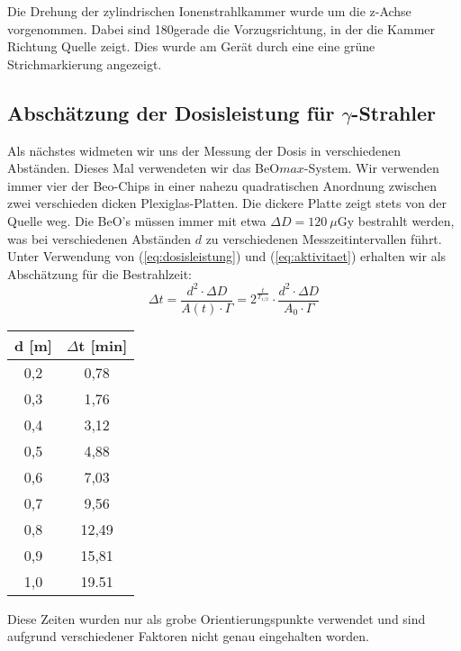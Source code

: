 Die Drehung der zylindrischen Ionenstrahlkammer wurde um die z-Achse vorgenommen. Dabei sind 180\textdegree gerade die Vorzugsrichtung, in der die Kammer Richtung Quelle zeigt. Dies wurde am Gerät durch eine eine grüne Strichmarkierung angezeigt.

\subsection{Abschätzung der Dosisleistung für $\gamma$-Strahler}

Als nächstes widmeten wir uns der Messung der Dosis in verschiedenen Abständen. Dieses Mal verwendeten wir das BeO$max$-System. Wir verwenden immer vier der Beo-Chips in einer nahezu quadratischen Anordnung zwischen zwei verschieden dicken Plexiglas-Platten. Die dickere Platte zeigt stets von der Quelle weg.
Die BeO's müssen immer mit etwa $\Delta D = 120\ \mu$Gy bestrahlt werden, was bei verschiedenen Abständen $d$ zu verschiedenen Messzeitintervallen führt. Unter Verwendung von (\ref{eq:dosisleistung}) und (\ref{eq:aktivitaet}) erhalten wir als Abschätzung für die Bestrahlzeit:
\begin{equation}
		\Delta t 	= \frac{d^2 \cdot \Delta D}{A(t) \cdot \Gamma} 
					= 2^{\frac{t}{T_{1/2}}} \cdot \frac{d^2 \cdot \Delta D}{A_0 \cdot \Gamma} 
\end{equation}

\vspace{5mm}
\minipanf
	\begin{center}
		\begin{tabular}{c|c}
				   \textbf{d} [m] & \textbf{$\Delta$t} [min] \\ 
		\hline     0,2 &  0,78 \\ 
				   0,3 &  1,76 \\ 
				   0,4 &  3,12 \\ 
				   0,5 &  4,88 \\ 
				   0,6 &  7,03 \\ 
				   0,7 &  9,56 \\ 
				   0,8 & 12,49 \\ 
				   0,9 & 15,81 \\ 
				   1,0 & 19.51 \\  
		\end{tabular}
		\label{dft:Zeiten} 
	\end{center}
\minipend
\vspace{5mm}

Diese Zeiten wurden nur als grobe Orientierungspunkte verwendet und sind aufgrund verschiedener Faktoren nicht genau eingehalten worden.

